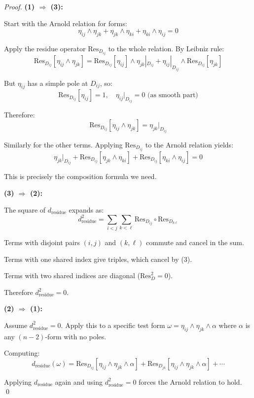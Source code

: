 \begin{proof}
\textbf{(1) $\Rightarrow$ (3):}

Start with the Arnold relation for forms:
$$\eta_{ij} \wedge \eta_{jk} + \eta_{jk} \wedge \eta_{ki} + \eta_{ki} \wedge \eta_{ij} = 0$$

Apply the residue operator $\text{Res}_{D_{ij}}$ to the whole relation. By Leibniz rule:
$$\text{Res}_{D_{ij}}[\eta_{ij} \wedge \eta_{jk}] = \text{Res}_{D_{ij}}[\eta_{ij}] \wedge 
\eta_{jk}|_{D_{ij}} + \eta_{ij}|_{D_{ij}} \wedge \text{Res}_{D_{ij}}[\eta_{jk}]$$

But $\eta_{ij}$ has a simple pole at $D_{ij}$, so:
$$\text{Res}_{D_{ij}}[\eta_{ij}] = 1, \quad \eta_{ij}|_{D_{ij}} = 0 \text{ (as smooth part)}$$

Therefore:
$$\text{Res}_{D_{ij}}[\eta_{ij} \wedge \eta_{jk}] = \eta_{jk}|_{D_{ij}}$$

Similarly for the other terms. Applying $\text{Res}_{D_{ij}}$ to the Arnold relation yields:
$$\eta_{jk}|_{D_{ij}} + \text{Res}_{D_{ij}}[\eta_{jk} \wedge \eta_{ki}] + 
\text{Res}_{D_{ij}}[\eta_{ki} \wedge \eta_{ij}] = 0$$

This is precisely the composition formula we need.

\textbf{(3) $\Rightarrow$ (2):}

The square of $d_{\text{residue}}$ expands as:
$$d_{\text{residue}}^2 = \sum_{i<j} \sum_{k<\ell} \text{Res}_{D_{ij}} \circ \text{Res}_{D_{k\ell}}$$

Terms with disjoint pairs $(i,j)$ and $(k,\ell)$ commute and cancel in the sum.

Terms with one shared index give triples, which cancel by (3).

Terms with two shared indices are diagonal ($\text{Res}_D^2 = 0$).

Therefore $d_{\text{residue}}^2 = 0$.

\textbf{(2) $\Rightarrow$ (1):}

Assume $d_{\text{residue}}^2 = 0$. Apply this to a specific test form
$\omega = \eta_{ij} \wedge \eta_{jk} \wedge \alpha$ where $\alpha$ is any $(n-2)$-form
with no poles.

Computing:
$$d_{\text{residue}}(\omega) = \text{Res}_{D_{ij}}[\eta_{ij} \wedge \eta_{jk} \wedge \alpha]
+ \text{Res}_{D_{jk}}[\eta_{ij} \wedge \eta_{jk} \wedge \alpha] + \cdots$$

Applying $d_{\text{residue}}$ again and using $d_{\text{residue}}^2 = 0$ forces the Arnold
relation to hold.
\qed
\end{proof}

